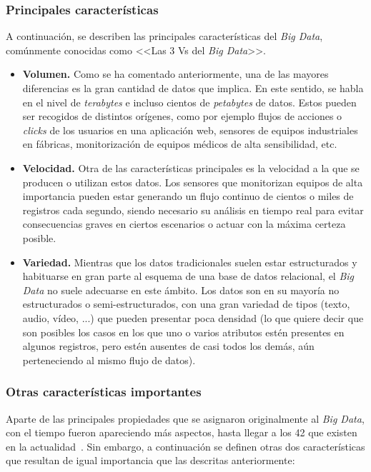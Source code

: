 \subsubsection{Principales características}

A continuación, se describen las principales características del \textit{Big Data}, comúnmente conocidas como <<Las 3 Vs del \textit{Big Data}>>. 

\begin{itemize}
    \item \textbf{Volumen.} Como se ha comentado anteriormente, una de las mayores diferencias es la gran cantidad de datos que implica. En este sentido, se habla en el nivel de \textit{terabytes} e incluso cientos de \textit{petabytes} de datos. Estos pueden ser recogidos de distintos orígenes, como por ejemplo flujos de acciones o \textit{clicks} de los usuarios en una aplicación web, sensores de equipos industriales en fábricas, monitorización de equipos médicos de alta sensibilidad, etc.  

    \item \textbf{Velocidad.} Otra de las características principales es la velocidad a la que se producen o utilizan estos datos. Los sensores que monitorizan equipos de alta importancia pueden estar generando un flujo continuo de cientos o miles de registros cada segundo, siendo necesario su análisis en tiempo real para evitar consecuencias graves en ciertos escenarios o actuar con la máxima certeza posible.
    
    \item \textbf{Variedad.} Mientras que los datos tradicionales suelen estar estructurados y habituarse en gran parte al esquema de una base de datos relacional, el \textit{Big Data} no suele adecuarse en este ámbito. Los datos son en su mayoría no estructurados o semi-estructurados, con una gran variedad de tipos (texto, audio, vídeo, ...) que pueden presentar poca densidad (lo que quiere decir que son posibles los casos en los que uno o varios atributos estén presentes en algunos registros, pero estén ausentes de casi todos los demás, aún perteneciendo al mismo flujo de datos).
\end{itemize}

\subsubsection{Otras características importantes}

Aparte de las principales propiedades que se asignaron originalmente al \textit{Big Data}, con el tiempo fueron apareciendo más aspectos, hasta llegar a los 42 que existen en la actualidad~\cite{shaferData}. Sin embargo, a continuación se definen otras dos características que resultan de igual importancia que las descritas anteriormente:

